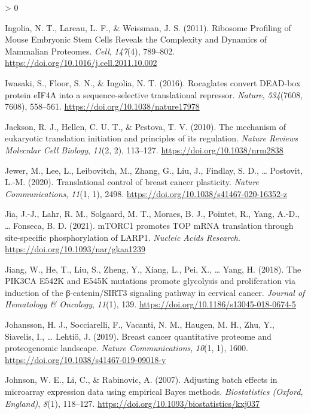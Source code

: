 \documentclass[
  12pt,
  openany]{book}
\newlength{\cslhangindent}
\newenvironment{CSLReferences}[2] %
 {%
  \setlength{\parindent}{0pt}
  \ifodd #1 \everypar{\setlength{\hangindent}{\cslhangindent}}\ignorespaces\fi
  \ifnum #2 > 0
  \setlength{\parskip}{#2\baselineskip}
  \fi
 }%
 {}
\begin{document}
\begin{CSLReferences}{1}{0}
\leavevmode\hypertarget{ref-Ingolia2011}{}%
Ingolia, N. T., Lareau, L. F., \& Weissman, J. S. (2011). Ribosome {Profiling} of {Mouse Embryonic Stem Cells Reveals} the {Complexity} and {Dynamics} of {Mammalian Proteomes}. \emph{Cell}, \emph{147}(4), 789--802. \url{https://doi.org/10.1016/j.cell.2011.10.002}

\leavevmode\hypertarget{ref-Iwasaki2016}{}%
Iwasaki, S., Floor, S. N., \& Ingolia, N. T. (2016). Rocaglates convert {DEAD}-box protein {eIF4A} into a sequence-selective translational repressor. \emph{Nature}, \emph{534}(7608, 7608), 558--561. \url{https://doi.org/10.1038/nature17978}

\leavevmode\hypertarget{ref-Jackson2010}{}%
Jackson, R. J., Hellen, C. U. T., \& Pestova, T. V. (2010). The mechanism of eukaryotic translation initiation and principles of its regulation. \emph{Nature Reviews Molecular Cell Biology}, \emph{11}(2, 2), 113--127. \url{https://doi.org/10.1038/nrm2838}

\leavevmode\hypertarget{ref-Jewer2020}{}%
Jewer, M., Lee, L., Leibovitch, M., Zhang, G., Liu, J., Findlay, S. D., \ldots{} Postovit, L.-M. (2020). Translational control of breast cancer plasticity. \emph{Nature Communications}, \emph{11}(1, 1), 2498. \url{https://doi.org/10.1038/s41467-020-16352-z}

\leavevmode\hypertarget{ref-Jia2021}{}%
Jia, J.-J., Lahr, R. M., Solgaard, M. T., Moraes, B. J., Pointet, R., Yang, A.-D., \ldots{} Fonseca, B. D. (2021). {mTORC1} promotes {TOP mRNA} translation through site-specific phosphorylation of {LARP1}. \emph{Nucleic Acids Research}. \url{https://doi.org/10.1093/nar/gkaa1239}

\leavevmode\hypertarget{ref-Jiang2018}{}%
Jiang, W., He, T., Liu, S., Zheng, Y., Xiang, L., Pei, X., \ldots{} Yang, H. (2018). The {PIK3CA E542K} and {E545K} mutations promote glycolysis and proliferation via induction of the β-catenin/{SIRT3} signaling pathway in cervical cancer. \emph{Journal of Hematology \& Oncology}, \emph{11}(1), 139. \url{https://doi.org/10.1186/s13045-018-0674-5}

\leavevmode\hypertarget{ref-Johansson2019}{}%
Johansson, H. J., Socciarelli, F., Vacanti, N. M., Haugen, M. H., Zhu, Y., Siavelis, I., \ldots{} Lehtiö, J. (2019). Breast cancer quantitative proteome and proteogenomic landscape. \emph{Nature Communications}, \emph{10}(1, 1), 1600. \url{https://doi.org/10.1038/s41467-019-09018-y}

\leavevmode\hypertarget{ref-Johnson2007}{}%
Johnson, W. E., Li, C., \& Rabinovic, A. (2007). Adjusting batch effects in microarray expression data using empirical {Bayes} methods. \emph{Biostatistics (Oxford, England)}, \emph{8}(1), 118--127. \url{https://doi.org/10.1093/biostatistics/kxj037}


\end{CSLReferences}
\end{document}
